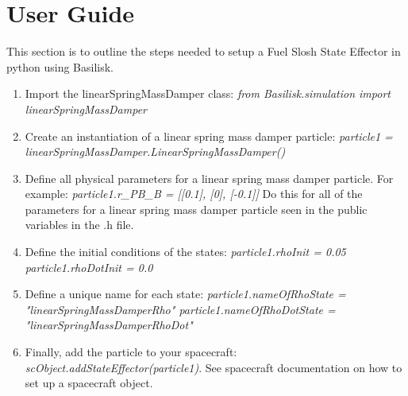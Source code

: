 \section{User Guide}

This section is to outline the steps needed to setup a Fuel Slosh State Effector in python using Basilisk.

\begin{enumerate}
	\item Import the linearSpringMassDamper class: \newline \textit{from Basilisk.simulation import linearSpringMassDamper}
	\item Create an instantiation of a linear spring mass damper particle: \newline \textit{particle1 = linearSpringMassDamper.LinearSpringMassDamper()}
	\item Define all physical parameters for a linear spring mass damper particle. For example: \newline
	\textit{particle1.r\_PB\_B = [[0.1], [0], [-0.1]]}
	Do this for all of the parameters for a linear spring mass damper particle seen in the public variables in the .h file.
	\item Define the initial conditions of the states:\newline
	\textit{particle1.rhoInit = 0.05 \quad particle1.rhoDotInit = 0.0}
	\item Define a unique name for each state:\newline
	\textit{particle1.nameOfRhoState = "linearSpringMassDamperRho" \quad particle1.nameOfRhoDotState = "linearSpringMassDamperRhoDot"}
	\item Finally, add the particle to your spacecraft:\newline
	\textit{scObject.addStateEffector(particle1)}. See spacecraft documentation on how to set up a spacecraft object.
\end{enumerate}
